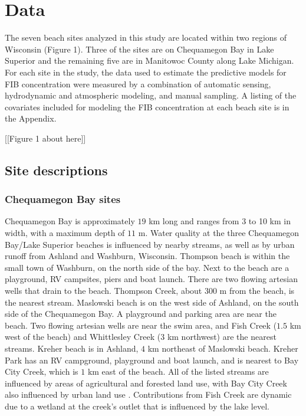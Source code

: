 \documentclass[authoryear,review, 12pt]{elsarticle}
\begin{document}
\section{Data}\label{data}

The seven beach sites analyzed in this study are located within two
 regions of Wisconsin (Figure 1). Three of the
sites are on Chequamegon Bay in Lake Superior and the remaining five are
in Manitowoc County along Lake Michigan. For each site in the study, the
data used to estimate the predictive models for FIB concentration were
measured by a combination of automatic sensing, hydrodynamic and
atmospheric modeling, and manual sampling. A listing of the covariates
included for modeling the FIB concentration at each beach site is in the
Appendix.

[[Figure 1 about here]]

\subsection{Site descriptions}\label{site-descriptions}

\subsubsection{Chequamegon Bay sites}\label{chequamegon-bay-sites}

Chequamegon Bay is approximately \(19\) km long and ranges from 3 to 10
km in width, with a maximum depth of \(11\) m. Water quality at the
three Chequamegon Bay/Lake Superior beaches is influenced by nearby
streams, as well as by urban runoff from Ashland and Washburn,
Wisconsin. Thompson beach is within the small town of Washburn, on the
north side of the bay. Next to the beach are a playground, RV campsites,
piers and boat launch. There are two flowing artesian wells that drain
to the beach. Thompson Creek, about \(300\) m from the beach, is the
nearest stream. Maslowski beach is on the west side of Ashland, on the
south side of the Chequamegon Bay. A playground and parking area are
near the beach. Two flowing artesian wells are near the swim area, and
Fish Creek (\(1.5\) km west of the beach) and Whittlesley Creek (\(3\)
km northwest) are the nearest streams. Kreher beach is in Ashland, \(4\)
km northeast of Maslowski beach. Kreher Park has an RV campground,
playground and boat launch, and is nearest to Bay City Creek, which is
\(1\) km east of the beach. All of the listed streams are influenced by
areas of agricultural and forested land use, with Bay City Creek also
influenced by urban land use \citep{Francy-et-al-2013}. Contributions
from Fish Creek are dynamic due to a wetland at the creek's outlet that
is influenced by the lake level.
\end{document}
